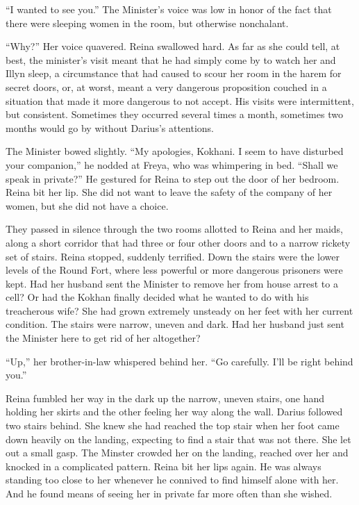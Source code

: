 \documentclass{article}
\begin{document}
	“I wanted to see you.” The Minister’s voice was low in honor of the fact that there were sleeping women in the room, but otherwise nonchalant. 
	
	“Why?” Her voice quavered. Reina swallowed hard. As far as she could tell, at best, the minister’s visit meant that he had simply come by to watch her and Illyn sleep, a circumstance that had caused to scour her room in the harem for secret doors, or, at worst, meant a very dangerous proposition couched in a situation that made it more dangerous to not accept. His visits were intermittent, but consistent. Sometimes they occurred several times a month, sometimes two months would go by without Darius’s attentions.
	
	The Minister bowed slightly. “My apologies, Kokhani. I seem to have disturbed your companion,” he nodded at Freya, who was whimpering in bed. “Shall we speak in private?” He gestured for Reina to step out the door of her bedroom. Reina bit her lip. She did not want to leave the safety of the company of her women, but she did not have a choice. 
	
	They passed in silence through the two rooms allotted to Reina and her maids, along a short corridor that had three or four other doors and to a narrow rickety set of stairs. Reina stopped, suddenly terrified. Down the stairs were the lower levels of the Round Fort, where less powerful or more dangerous prisoners were kept. Had her husband sent the Minister to remove her from house arrest to a cell? Or had the Kokhan finally decided what he wanted to do with his treacherous wife? She had grown extremely unsteady on her feet with her current condition. The stairs were narrow, uneven and dark. Had her husband just sent the Minister here to get rid of her altogether?
	
	“Up,” her brother-in-law whispered behind her. “Go carefully. I’ll be right behind you.”
	
	Reina fumbled her way in the dark up the narrow, uneven stairs, one hand holding her skirts and the other feeling her way along the wall. Darius followed two stairs behind. She knew she had reached the top stair when her foot came down heavily on the landing, expecting to find a stair that was not there. She let out a small gasp. The Minster crowded her on the landing, reached over her and knocked in a complicated pattern. Reina bit her lips again. He was always standing too close to her whenever he connived to find himself alone with her. And he found means of seeing her in private far more often than she wished. 
	
\end{document}

